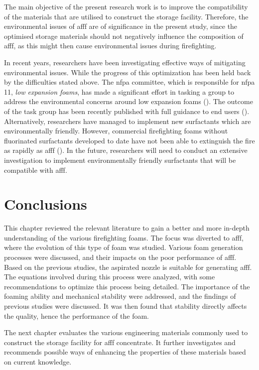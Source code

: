 The main objective of the present research work is to improve the compatibility of the materials that are utilised to construct the storage facility. Therefore, the environmental issues of \acrshort{afff} are of significance in the present study, since the optimised storage materials should not negatively influence the composition of \acrshort{afff}, as this might then cause environmental issues during firefighting.  

In recent years, researchers have been investigating effective ways of mitigating environmental issues. While the progress of this optimization has been held back by the difficulties stated above. The \acrshort{nfpa} committee, which is responsible for \acrshort{nfpa} 11, \emph{low expansion foams}, has made a significant effort in tasking a group to address the environmental concerns around low expansion foams (\cite{scheffey1995evaluating}). The outcome of the task group has been recently published with full guidance to end users (\cite{scheffey1995evaluating}). Alternatively, researchers have managed to implement new surfactants which are environmentally friendly. However, commercial firefighting foams without fluorinated surfactants developed to date have not been able to extinguish the fire as rapidly as \acrshort{afff} (\cite{hinnant2017influence}). In the future, researchers will need to conduct an extensive investigation to implement environmentally friendly surfactants that will be compatible with \acrshort{afff}.

\section{Conclusions}
This chapter reviewed the relevant literature to gain a better and more in-depth understanding of the various firefighting foams. The focus was diverted to \acrshort{afff}, where the evolution of this type of foam was studied. Various foam generation processes were discussed, and their impacts on the poor performance of \acrshort{afff}. Based on the previous studies, the aspirated nozzle is suitable for generating \acrshort{afff}. The equations involved during this process were analyzed, with some recommendations to optimize this process being detailed. The importance of the foaming ability and mechanical stability were addressed, and the findings of previous studies were discussed. It was then found that stability directly affects the quality, hence the performance of the foam.  

The next chapter evaluates the various engineering materials commonly used to construct the storage facility for \acrshort{afff} concentrate. It further investigates and recommends possible ways of enhancing the properties of these materials based on current knowledge. 